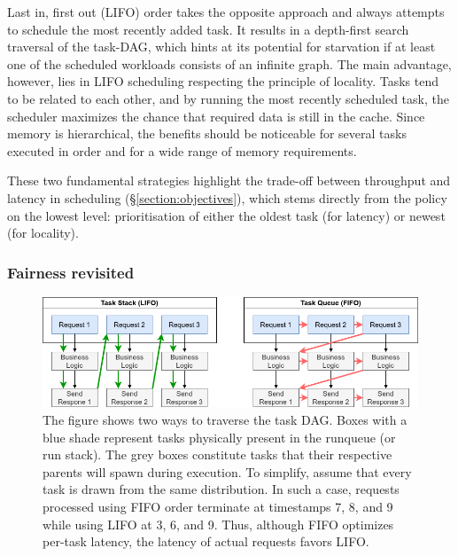 \documentclass[12pt,a4paper,twoside]{report}
\begin{document}
Last in, first out (LIFO) order takes the opposite approach and always attempts to schedule the most recently added task. It results in a depth-first search traversal of the task-DAG, which hints at its potential for starvation if at least one of the scheduled workloads consists of an infinite graph. The main advantage, however, lies in LIFO scheduling respecting the principle of locality. Tasks tend to be related to each other, and by running the most recently scheduled task, the scheduler maximizes the chance that required data is still in the cache. Since memory is hierarchical, the benefits should be noticeable for several tasks executed in order and for a wide range of memory requirements. 

These two fundamental strategies highlight the trade-off between throughput and latency in scheduling (\S\ref{section:objectives}), which stems directly from the policy on the lowest level: prioritisation of either the oldest task (for latency) or newest (for locality).


\subsubsection{Fairness revisited}
\label{section:fairness-revisited}

\begin{figure}
    \centering
    \includegraphics[width=1\textwidth]{FIFOLIFO.png}
    \caption{The figure shows two ways to traverse the task DAG. Boxes with a blue shade represent tasks physically present in the runqueue (or run stack). The grey boxes constitute tasks that their respective parents will spawn during execution. To simplify, assume that every task is drawn from the same distribution. In such a case, requests processed using FIFO order terminate at timestamps 7, 8, and 9 while using LIFO at 3, 6, and 9. Thus, although FIFO optimizes per-task latency, the latency of actual requests favors LIFO.}
   \label{fig:fifo-lifo-latency}
\end{figure}
\end{document}
